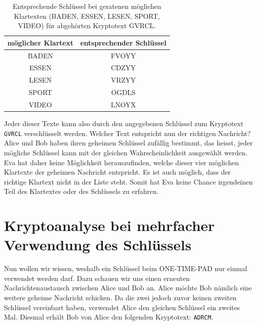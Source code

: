 \begin{table}[H]
	\centering
	\begin{tabular}{c|c}
		möglicher Klartext & entsprechender Schlüssel \\ \hline
		BADEN              & FVOYY                    \\
		ESSEN              & CDZYY                    \\
		LESEN              & VRZYY                    \\
		SPORT              & OGDLS                    \\
		VIDEO              & LNOYX
	\end{tabular}
	\caption{Entsprechende Schlüssel bei geratenen möglichen Klartexten (BADEN, ESSEN, LESEN, SPORT, VIDEO) für abgehörten Kryptotext GVRCL.}
	\label{tab:GVRCL}
\end{table}
Jeder dieser Texte kann also durch den angegebenen Schlüssel zum Kryptotext \verb|GVRCL|
verschlüsselt werden. Welcher Text entspricht nun der richtigen Nachricht? Alice und Bob
haben ihren geheimen Schlüssel zufällig bestimmt, das heisst, jeder mögliche Schlüssel
kann mit der gleichen Wahrscheinlichkeit ausgewählt werden. Eva hat daher keine Möglichkeit herauszufinden, welche dieser vier möglichen Klartexte der geheimen Nachricht
entspricht. Es ist auch möglich, dass der richtige Klartext nicht in der Liste steht. Somit
hat Eva keine Chance irgendeinen Teil des Klartextes oder des Schlüssels zu erfahren.

\section{Kryptoanalyse bei mehrfacher Verwendung des Schlüssels}
Nun wollen wir wissen, weshalb ein Schlüssel beim ONE-TIME-PAD nur einmal verwendet werden darf. Dazu schauen wir uns einen erneuten Nachrichtenaustausch zwischen
Alice und Bob an.
Alice möchte Bob nämlich eine weitere geheime Nachricht schicken. Da die zwei
jedoch zuvor keinen zweiten Schlüssel vereinbart haben, verwendet Alice den gleichen
Schlüssel ein zweites Mal. Diesmal erhält Bob von Alice den folgenden Kryptotext: \verb|ADRCM|.


